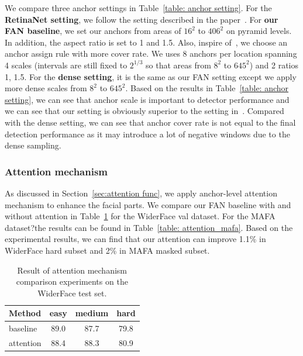\documentclass[10pt,twocolumn,letterpaper]{article}
\begin{document}
We compare three anchor settings in Table~\ref{table: anchor setting}. For the \textbf{RetinaNet setting}, we follow the setting described in the paper~\cite{lin2017focal}. For \textbf{our FAN baseline}, we set our anchors from areas of $ 16^2 $ to $ 406^2 $ on pyramid levels. In addition, the aspect ratio is set to 1 and 1.5. Also, inspire of~\cite{zhang2017s3fd}, we choose an anchor assign rule with more cover rate. We uses 8 anchors per location spanning 4 scales (intervals are still fixed to $ 2^{1/3} $ so that areas from $ 8^2 $ to $ 645^2 $) and 2 ratios {1, 1.5}.  For the \textbf{dense setting}, it is the same as our FAN setting except we apply more dense scales from $ 8^2 $ to $ 645^2 $. Based on the results in Table~\ref{table: anchor setting}, we can see that anchor scale is important to detector performance and we can see that our setting is obviously superior to the setting in~\cite{lin2017focal}. Compared with the dense setting, we can see that anchor cover rate is not equal to the final detection performance as it may introduce a lot of negative windows due to the dense sampling.


\subsubsection{Attention mechanism}
As discussed in Section~\ref{sec:attention func}, we apply anchor-level attention mechanism to enhance the facial parts. We compare our FAN baseline with and without attention in Table~\ref{table: attention_wider} for the WiderFace val dataset. For the MAFA dataset?the results can be found in Table~\ref{table: attention_mafa}. Based on the experimental results, we can find that our attention can improve 1.1\% in WiderFace hard subset and 2\% in MAFA masked subset.

\begin{table}[htbp]
\begin{center}
\begin{tabular}{|l|c|c|c|}
\hline
Method & easy & medium & hard \\
\hline
baseline & 89.0 & 87.7 & 79.8 \\
attention & 88.4 & 88.3 & 80.9 \\
\hline
\end{tabular}
\end{center}
\caption{Result of attention mechanism comparison experiments on the WiderFace test set.}
\label{table: attention_wider}
\end{table}
\end{document}
